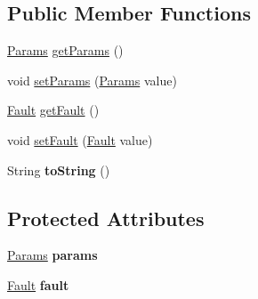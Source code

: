 \subsection*{Public Member Functions}
\begin{DoxyCompactItemize}
\item 
\mbox{\hyperlink{classcom_1_1mysql_1_1fabric_1_1xmlrpc_1_1base_1_1_params}{Params}} \mbox{\hyperlink{classcom_1_1mysql_1_1fabric_1_1xmlrpc_1_1base_1_1_method_response_af2e4de27b8922d307cfc9a8e4bce59a0}{get\+Params}} ()
\item 
void \mbox{\hyperlink{classcom_1_1mysql_1_1fabric_1_1xmlrpc_1_1base_1_1_method_response_a0fd5a58cb654852a1dbfc8298747bb48}{set\+Params}} (\mbox{\hyperlink{classcom_1_1mysql_1_1fabric_1_1xmlrpc_1_1base_1_1_params}{Params}} value)
\item 
\mbox{\hyperlink{classcom_1_1mysql_1_1fabric_1_1xmlrpc_1_1base_1_1_fault}{Fault}} \mbox{\hyperlink{classcom_1_1mysql_1_1fabric_1_1xmlrpc_1_1base_1_1_method_response_a9114e14bc8cb8773b68d03d7fbe3ef1c}{get\+Fault}} ()
\item 
void \mbox{\hyperlink{classcom_1_1mysql_1_1fabric_1_1xmlrpc_1_1base_1_1_method_response_ac944ae093d3841d8e084da57c77dfac9}{set\+Fault}} (\mbox{\hyperlink{classcom_1_1mysql_1_1fabric_1_1xmlrpc_1_1base_1_1_fault}{Fault}} value)
\item 
\mbox{\label{classcom_1_1mysql_1_1fabric_1_1xmlrpc_1_1base_1_1_method_response_a1577a7cc96e864600e8f90710c41db73}} 
String {\bfseries to\+String} ()
\end{DoxyCompactItemize}
\subsection*{Protected Attributes}
\begin{DoxyCompactItemize}
\item 
\mbox{\label{classcom_1_1mysql_1_1fabric_1_1xmlrpc_1_1base_1_1_method_response_ab1e587fb7da851366082b1b13741a0b9}} 
\mbox{\hyperlink{classcom_1_1mysql_1_1fabric_1_1xmlrpc_1_1base_1_1_params}{Params}} {\bfseries params}
\item 
\mbox{\label{classcom_1_1mysql_1_1fabric_1_1xmlrpc_1_1base_1_1_method_response_a5d5c8dedb33727000d5e424324bb7859}} 
\mbox{\hyperlink{classcom_1_1mysql_1_1fabric_1_1xmlrpc_1_1base_1_1_fault}{Fault}} {\bfseries fault}
\end{DoxyCompactItemize}


